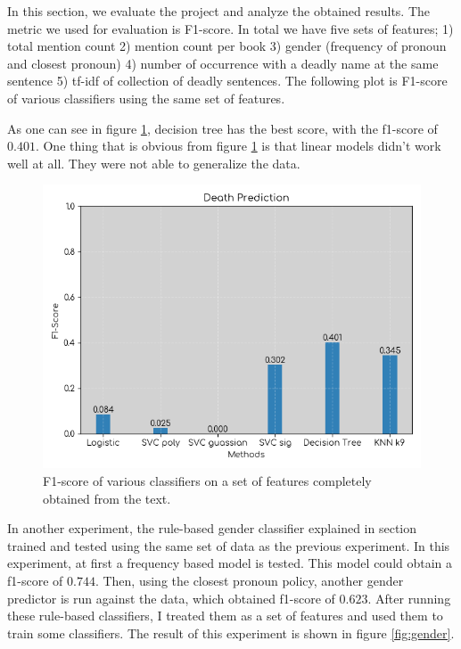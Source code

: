 \documentclass[letterpaper]{article}
\begin{document}
In this section, we evaluate the project and analyze the obtained results. The metric we used for evaluation is F1-score. In total we have five sets of features; 1) total mention count 2) mention count per book 3) gender (frequency of pronoun and closest pronoun) 4) number of occurrence with a deadly name at the same sentence 5) tf-idf of collection of deadly sentences. The following plot is F1-score of various classifiers using the same set of features.

As one can see in figure \ref{fig:f1}, decision tree has the best score, with the f1-score of $0.401$. One thing that is obvious from figure \ref{fig:f1} is that linear models didn't work well at all. They were not able to generalize the data.


\begin{figure}
	\centering
	\includegraphics[scale=.60]{f1_scores.png}
	\caption{F1-score of various classifiers on a set of features completely obtained from the text.}
	\label{fig:f1}
\end{figure}

In another experiment, the rule-based gender classifier explained in section  trained and tested using the same set of data as the previous experiment. In this experiment, at first a frequency based model is tested. This model could obtain a f1-score of $0.744$. Then, using the closest pronoun policy, another gender predictor is run against the data, which obtained f1-score of $0.623$. After running these rule-based classifiers, I treated them as a set of features and used them to train some classifiers. The result of this experiment is shown in figure \ref{fig:gender}.
\end{document}
